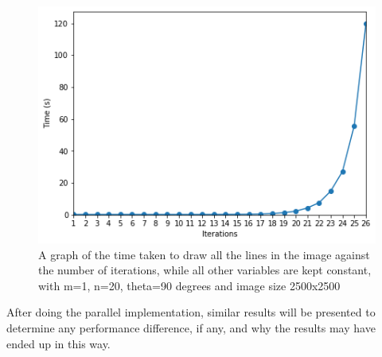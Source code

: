 \begin{figure}
	\label{fig:iterVStimeImage}
	\includegraphics[width=\linewidth]{Images/iterVStimeImage.png}
	\centering
	\caption{A graph of the time taken to draw all the lines in the image against the number of iterations, while all other variables are kept constant, with m=1, n=20, theta=90 degrees and image size 2500x2500}
\end{figure}

After doing the parallel implementation, similar results will be presented to determine any performance difference, if any, and why the results may have ended up in this way.